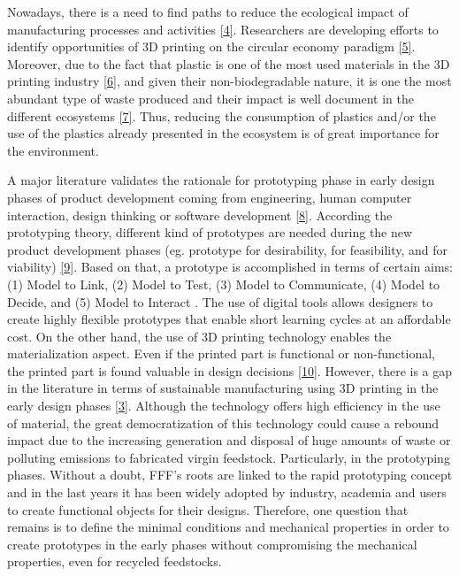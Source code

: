 \documentclass[conference,final,]{IEEEtran}
\begin{document}
Nowadays, there is a need to find paths to reduce the ecological impact
of manufacturing processes and activities
\protect\hyperlink{ref-Niaki2019}{{[}4{]}}. Researchers are developing
efforts to identify opportunities of 3D printing on the circular economy
paradigm \protect\hyperlink{ref-Despeisse2016}{{[}5{]}}. Moreover, due
to the fact that plastic is one of the most used materials in the 3D
printing industry
\protect\hyperlink{ref-GonzalezHenriquez2019}{{[}6{]}}, and given their
non-biodegradable nature, it is one the most abundant type of waste
produced and their impact is well document in the different ecosystems
\protect\hyperlink{ref-Ryberg2019}{{[}7{]}}. Thus, reducing the
consumption of plastics and/or the use of the plastics already presented
in the ecosystem is of great importance for the environment.

A major literature validates the rationale for prototyping phase in
early design phases of product development coming from engineering,
human computer interaction, design thinking or software development
\protect\hyperlink{ref-Elverum2016a}{{[}8{]}}. According the prototyping
theory, different kind of prototypes are needed during the new product
development phases (eg. prototype for desirability, for feasibility, and
for viability) \protect\hyperlink{ref-Menold2017}{{[}9{]}}. Based on
that, a prototype is accomplished in terms of certain aims: (1) Model to
Link, (2) Model to Test, (3) Model to Communicate, (4) Model to Decide,
and (5) Model to Interact . The use of digital tools allows designers to
create highly flexible prototypes that enable short learning cycles at
an affordable cost. On the other hand, the use of 3D printing technology
enables the materialization aspect. Even if the printed part is
functional or non-functional, the printed part is found valuable in
design decisions \protect\hyperlink{ref-Elverum2016}{{[}10{]}}. However,
there is a gap in the literature in terms of sustainable manufacturing
using 3D printing in the early design phases
\protect\hyperlink{ref-Peng2018}{{[}3{]}}. Although the technology
offers high efficiency in the use of material, the great democratization
of this technology could cause a rebound impact due to the increasing
generation and disposal of huge amounts of waste or polluting emissions
to fabricated virgin feedstock. Particularly, in the prototyping phases.
Without a doubt, FFF's roots are linked to the rapid prototyping concept
and in the last years it has been widely adopted by industry, academia
and users to create functional objects for their designs. Therefore, one
question that remains is to define the minimal conditions and mechanical
properties in order to create prototypes in the early phases without
compromising the mechanical properties, even for recycled feedstocks.
\end{document}
